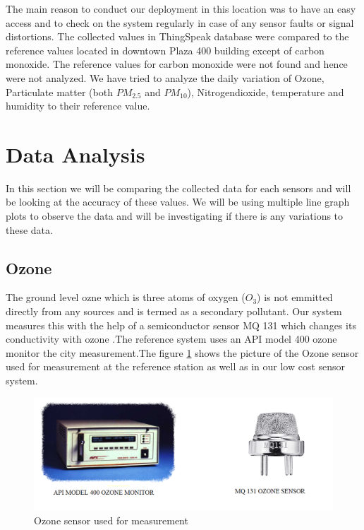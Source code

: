   The main reason to conduct our deployment in this location was to have an easy access and to check on the system regularly in case of any sensor faults or signal distortions. The collected values in ThingSpeak database were compared to the reference values located in downtown Plaza 400 building except of carbon monoxide. The reference values for carbon monoxide were not found and hence were not analyzed. We have tried to analyze the daily variation of  Ozone, Particulate matter (both $PM_{2.5}$ and $PM_{10}$), Nitrogendioxide, temperature and humidity to their reference value.

  \section{Data Analysis}
  In this section we will be comparing the collected data for each sensors and will be looking at the accuracy of these values. We will be using multiple line graph plots to observe the data and will be investigating if there is any variations to these data.
  
  \subsection{Ozone}

  The ground level ozne which is three atoms of oxygen ($O_3$) is not emmitted directly from any sources and is termed as a secondary pollutant. Our system measures this with the help of a semiconductor sensor MQ 131 which changes its conductivity with ozone \cite{technicalsheetozone}.The reference system uses an API model 400 ozone monitor the city measurement\cite{Environment2010}.The figure \ref{Ozonesensor} shows the picture of the Ozone sensor used for measurement at the reference station as well as in our low cost sensor system.
  \begin{figure}[h]
    \begin{center}
    \includegraphics[scale=0.70]{images/figure30.png}
    \end{center}
    \caption{Ozone sensor used for measurement}
    \label{Ozonesensor}
  \end{figure}
  \bigskip

